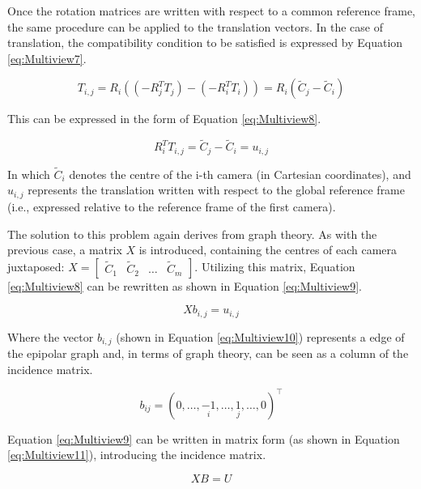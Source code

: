 Once the rotation matrices are written with respect to a common reference frame, the same procedure can be applied to the translation vectors.  
In the case of translation, the compatibility condition to be satisfied is expressed by Equation \ref{eq:Multiview7}.

\begin{equation}
  \label{eq:Multiview7}
  T_{i,j} = R_i ((-R_j^T T_j)-(-R_i^T T_i)) = R_i (\tilde{C}_j - \tilde{C}_i)
\end{equation}

This can be expressed in the form of Equation \ref{eq:Multiview8}.

\begin{equation}
  \label{eq:Multiview8}
  R_i^T T_{i,j} = \tilde{C}_j - \tilde{C}_i = u_{i,j}
\end{equation}

In which $\tilde{C}_i$ denotes the centre of the i-th camera (in Cartesian coordinates), and $u_{i,j}$ represents the translation written with respect to the global reference frame (i.e., expressed relative to the reference frame of the first camera).

The solution to this problem again derives from graph theory. As with the previous case, a matrix $X$ is introduced, containing the centres of each camera juxtaposed:
$X = \begin{bmatrix} \tilde{C}_1 & \tilde{C}_2 & \dots & \tilde{C}_m \end{bmatrix}$. 
Utilizing this matrix, Equation \ref{eq:Multiview8} can be rewritten as shown in Equation \ref{eq:Multiview9}.

\begin{equation}
  \label{eq:Multiview9}
  X b_{i,j} = u_{i,j}
\end{equation}

Where the vector $b_{i,j}$ (shown in Equation \ref{eq:Multiview10}) represents a edge of the epipolar graph and, in terms of graph theory, can be seen as a column of the incidence matrix.

\begin{equation}
  b_{ij} = (0, \dots, \underset{i}{-1}, \dots, \underset{j}{1}, \dots, 0)^{\top}
  \label{eq:Multiview10}
\end{equation}

Equation \ref{eq:Multiview9} can be written in matrix form (as shown in Equation \ref{eq:Multiview11}), introducing the incidence matrix.

\begin{equation}
  X B = U 
  \label{eq:Multiview11}
\end{equation}

